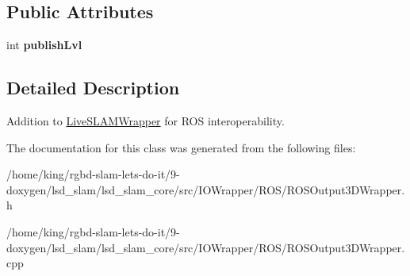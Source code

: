 \subsection*{Public Attributes}
\begin{DoxyCompactItemize}
\item 
\hypertarget{classlsd__slam_1_1_r_o_s_output3_d_wrapper_a2fce06578a8be424c08d8e0dd5ffb2b3}{int {\bfseries publish\-Lvl}}\label{classlsd__slam_1_1_r_o_s_output3_d_wrapper_a2fce06578a8be424c08d8e0dd5ffb2b3}

\end{DoxyCompactItemize}


\subsection{Detailed Description}
Addition to \hyperlink{structlsd__slam_1_1_live_s_l_a_m_wrapper}{Live\-S\-L\-A\-M\-Wrapper} for R\-O\-S interoperability. 

The documentation for this class was generated from the following files\-:\begin{DoxyCompactItemize}
\item 
/home/king/rgbd-\/slam-\/lets-\/do-\/it/9-\/doxygen/lsd\-\_\-slam/lsd\-\_\-slam\-\_\-core/src/\-I\-O\-Wrapper/\-R\-O\-S/R\-O\-S\-Output3\-D\-Wrapper.\-h\item 
/home/king/rgbd-\/slam-\/lets-\/do-\/it/9-\/doxygen/lsd\-\_\-slam/lsd\-\_\-slam\-\_\-core/src/\-I\-O\-Wrapper/\-R\-O\-S/R\-O\-S\-Output3\-D\-Wrapper.\-cpp\end{DoxyCompactItemize}
